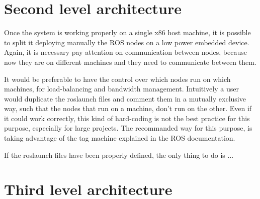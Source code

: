 \section{Second level architecture}
Once the system is working properly on a single x86 host machine, it is possible to split it deploying manually the ROS nodes on a low power embedded device.
Again, it is necessary pay attention on communication between nodes, because now they are on different machines and they need to communicate between them.


It would be preferable to have the control over which nodes run on which machines, for load-balancing and bandwidth management.
Intuitively a user would duplicate the roslaunch files and comment them in a mutually exclusive way, such that the nodes that run on a machine, don't run on the other. Even if it could work correctly, this kind of hard-coding is not the best practice for this purpose, especially for large projects. The recommanded way for this purpose, is taking advantage of the tag machine explained in the ROS documentation.


If the roslaunch files have been properly defined, the only thing to do is ...



















\section{Third level architecture}



























\clearpage
\thispagestyle{empty}